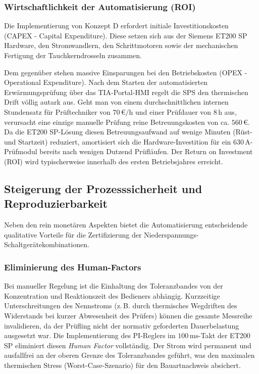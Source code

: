 \subsubsection{Wirtschaftlichkeit der Automatisierung (ROI)}
Die Implementierung von Konzept D erfordert initiale Investitionskosten (CAPEX - Capital Expenditure). Diese setzen sich aus der Siemens ET200 SP Hardware, den Stromwandlern, den Schrittmotoren sowie der mechanischen Fertigung der Tauchkerndrosseln zusammen.

Dem gegenüber stehen massive Einsparungen bei den Betriebskosten (OPEX - Operational Expenditure). Nach dem Starten der automatisierten Erwärmungsprüfung über das TIA-Portal-HMI regelt die SPS den thermischen Drift völlig autark aus. 
Geht man von einem durchschnittlichen internen Stundensatz für Prüftechniker von $70\,\text{€/h}$ und einer Prüfdauer von $8\,\text{h}$ aus, verursacht eine einzige manuelle Prüfung reine Betreuungskosten von ca. $560\,\text{€}$. Da die ET200 SP-Lösung diesen Betreuungsaufwand auf wenige Minuten (Rüst- und Startzeit) reduziert, amortisiert sich die Hardware-Investition für ein 630\,A-Prüfmodul bereits nach wenigen Dutzend Prüfläufen. Der Return on Investment (ROI) wird typischerweise innerhalb des ersten Betriebsjahres erreicht.
\subsection{Steigerung der Prozesssicherheit und Reproduzierbarkeit}
\label{sec:prozesssicherheit}

Neben den rein monetären Aspekten bietet die Automatisierung entscheidende qualitative Vorteile für die Zertifizierung der Niederspannungs-Schaltgerätekombinationen.
\subsubsection{Eliminierung des Human-Factors}
Bei manueller Regelung ist die Einhaltung des Toleranzbandes von der Konzentration und Reaktionszeit des Bedieners abhängig. Kurzzeitige Unterschreitungen des Nennstroms (z.\,B. durch thermisches Wegdriften des Widerstands bei kurzer Abwesenheit des Prüfers) können die gesamte Messreihe invalidieren, da der Prüfling nicht der normativ geforderten Dauerbelastung ausgesetzt war. Die Implementierung des PI-Reglers im $100\,\text{ms}$-Takt der ET200 SP eliminiert diesen \textit{Human Factor} vollständig. Der Strom wird permanent und ausfallfrei an der oberen Grenze des Toleranzbandes geführt, was den maximalen thermischen Stress (Worst-Case-Szenario) für den Bauartnachweis absichert.
